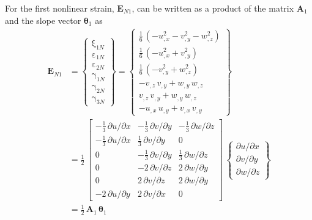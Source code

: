 For the first nonlinear strain, $\mathbf{E}_{N1}$, can be written as a product of the matrix $\mathbf{A}_1$ and the slope vector $\boldsymbol{\theta}_1$ as
\begin{equation}
\begin{aligned}
\mathbf{E}_{N1} & =  \begin{Bmatrix}
\mathrm \xi_{1N} \\
\mathrm \varepsilon_{1N} \\
\mathrm \varepsilon_{2N} \\
\mathrm \gamma_{1N} \\
\mathrm \gamma_{2N} \\
\mathrm \gamma_{3N} \end{Bmatrix} =
\begin{Bmatrix}
\tfrac{1}{6} \,  \left( -u_{,x}^2 - v_{,y}^2  -  w_{,z}^2  \right)\\
\tfrac{1}{6} \,  \left( -u_{,x}^2 +  v_{,y}^2 \right) \\
\tfrac{1}{6} \,  \left( - v_{,y}^2 + w_{,z}^2 \right) \\ 
 -v_{,z} \, v_{,y} + w_{,y} \, w_{,z} \\
 v_{,z} \, v_{,y} + w_{,y} \, w_{,z}\\ 
- u_{,x} \, u_{,y} + v_{,x} \, v_{,y}\end{Bmatrix} \\
& = \frac{1}{2} \, \begin{bmatrix}
-\tfrac{1}{3} \, \partial u / \partial x &  - \tfrac{1}{3} \, \partial v / \partial y & -\tfrac{1}{3} \, \partial w / \partial z  \\
-\tfrac{1}{3} \, \partial u / \partial x &  \tfrac{1}{3} \, \partial v / \partial y & 0  \\
0  & -\tfrac{1}{3} \, \partial v / \partial y & \tfrac{1}{3} \, \partial w / \partial z \\
0 &  - 2 \, \partial v / \partial z &  2 \,  \partial w / \partial y  \\
0 &  2 \, \partial v / \partial z  & 2 \,  \partial w / \partial y  \\
- 2 \, \partial u / \partial y &   2 \, \partial v / \partial x & 0   \end{bmatrix} \, \begin{Bmatrix}
\partial u / \partial x\\
\partial v / \partial y \\
\partial w / \partial z
\end{Bmatrix} \\
& = \tfrac{1}{2} \, \mathbf{A}_1 \, \boldsymbol{\theta}_1
\end{aligned}
\end{equation}
